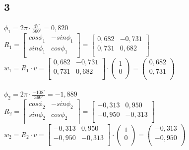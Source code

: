 \documentclass{../Vorlage/mat}
\begin{document}
\subsection*{3}
$\phi_1 = 2 \pi \cdot \frac{47^\circ}{360^\circ} = 0,820$\\
$R_1 = 
\begin{bmatrix}
cos \phi_1 & -sin \phi_1\\
sin \phi_1 & cos \phi_1\\
\end{bmatrix}
=
\begin{bmatrix}
0,682 & -0,731\\
0,731 & 0,682\\
\end{bmatrix}$\\
$w_1 = R_1 \cdot v =
\begin{bmatrix}
0,682 & -0,731\\
0,731 & 0,682\\
\end{bmatrix}
\cdot
\begin{pmatrix}
1\\
0\\
\end{pmatrix}
=
\begin{pmatrix}
0,682\\
0,731\\
\end{pmatrix}
$\\
\\
$\phi_2 = 2 \pi \cdot \frac{-108^\circ}{360^\circ} = -1,889$\\
$R_2 = 
\begin{bmatrix}
cos \phi_2 & -sin \phi_2\\
sin \phi_2 & cos \phi_2\\
\end{bmatrix}
=
\begin{bmatrix}
-0,313 & 0,950\\
-0,950 & -0,313\\
\end{bmatrix}$\\
$w_2 = R_2 \cdot v =
\begin{bmatrix}
-0,313 & 0,950\\
-0,950 & -0,313\\
\end{bmatrix}
\cdot
\begin{pmatrix}
1\\
0\\
\end{pmatrix}
=
\begin{pmatrix}
-0,313\\
-0,950\\
\end{pmatrix}
$\\
\\
\end{document}

